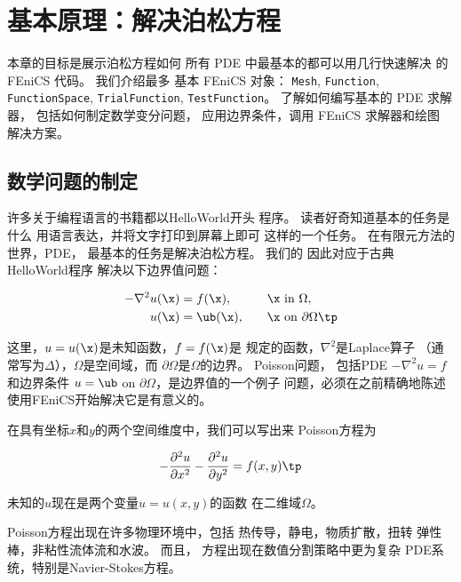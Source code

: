 \chapter{基本原理：解决泊松方程}
\label{ch:fundamentals}

\begin{summary}
本章的目标是展示泊松方程如何
所有 PDE 中最基本的都可以用几行快速解决
的 FEniCS 代码。 我们介绍最多
基本 FEniCS 对象：
\texttt{Mesh}, \texttt{Function}, \texttt{FunctionSpace}, \texttt{TrialFunction}, \texttt{TestFunction}。
了解如何编写基本的 PDE 求解器，
包括如何制定数学变分问题，
应用边界条件，调用 FEniCS 求解器和绘图
解决方案。
\end{summary}


\section{数学问题的制定}
\label{ftut:poisson1:bvp}

许多关于编程语言的书籍都以HelloWorld开头
程序。 读者好奇知道基本的任务是什么
用语言表达，并将文字打印到屏幕上即可
这样的一个任务。 在有限元方法的世界，PDE，
最基本的任务是解决泊松方程。 我们的
因此对应于古典HelloWorld程序
解决以下边界值问题：

\begin{alignat}{2}
- \nabla^2 u(\x) &= f(\x),\quad &&\x\mbox{ in } \Omega,
\label{ftut:poisson1}\\
u(\x) &= \ub(\x),\quad &&\x\mbox{ on } \partial \Omega\tp \label{ch:poisson0:bc}
\end{alignat}

这里，$u = u(\x)$是未知函数，$f = f(\x)$是
规定的函数，$\nabla^2$是Laplace算子
（通常写为$\Delta$），$\Omega$是空间域，而
$\partial \Omega$是$\Omega$的边界。 Poisson问题，
包括PDE $-\nabla^2u = f$和边界条件
$u = \ub$ on $\partial \Omega$，是边界值的一个例子
问题，必须在之前精确地陈述
使用FEniCS开始解决它是有意义的。

在具有坐标$x$和$y$的两个空间维度中，我们可以写出来
Poisson方程为

\begin{equation}
- {\partial^2 u\over\partial x^2} -
{\partial^2 u\over\partial y^2} = f(x,y)\tp
\end{equation}

未知的$u$现在是两个变量$u = u(x,y)$的函数
在二维域$\Omega$。

Poisson方程出现在许多物理环境中，包括
热传导，静电，物质扩散，扭转
弹性棒，非粘性流体流和水波。 而且，
方程出现在数值分割策略中更为复杂
PDE系统，特别是Navier-Stokes方程。

